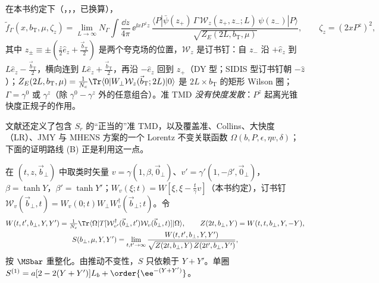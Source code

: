 \begin{definition}[准 TMD]\label{def:lamet-quasi-tmd}
在本书约定下（\cite{Ji:2019ewn}，\cite[第~3~节]{Liu:2022nnk}，\cite{Ebert:2022fmh}，已换算），
\begin{equation}\label{eq:lamet-quasi-tmd}
\tilde f_\Gamma(x,b_{\mathrm T},\mu,\zeta_z)=\lim_{L\to\infty}N_\Gamma\int\frac{\dd z}{4\pi}\,\ee^{\ii xP^zz}\,\frac{\langle P|\bar\psi(z_+)\,\Gamma\,\mathcal W_z(z_+,z_-;L)\,\psi(z_-)|P\rangle}{\sqrt{Z_E(2L,b_{\mathrm T},\mu)}},\qquad\zeta_z=(2xP^z)^2,
\end{equation}
其中 $z_\pm\equiv\pm(\frac z2\hat e_z+\frac{\vec b_{\mathrm T}}2)$ 是两个夸克场的位置，$\mathcal W_z$ 是订书钉：自 $z_-$ 沿 $+\hat e_z$ 到 $L\hat e_z-\frac{\vec b_{\mathrm T}}2$，横向连到 $L\hat e_z+\frac{\vec b_{\mathrm T}}2$，再沿 $-\hat e_z$ 回到 $z_+$（DY 型；SIDIS 型订书钉朝 $-\hat z$）；$Z_E(2L,b_{\mathrm T},\mu)=\frac1{N_c}\Tr\langle0|W_\perp\mathcal W_z(\vec b_{\mathrm T};2L)|0\rangle$ 是 $2L\times b_{\mathrm T}$ 的矩形 Wilson 圈；$\Gamma=\gamma^0$ 或 $\gamma^z$（除 $\gamma^0-\gamma^z$ 外的任意组合）。准 TMD \emph{没有快度发散}：$P^z$ 起离光锥快度正规子的作用。
\end{definition}

文献\cite{Ebert:2022fmh}还定义了包含 $S_r$ 的“正当的”准 TMD，以及覆盖准、Collins、大快度（LR）、JMY 与 MHENS 方案的一个 Lorentz 不变关联函数 $\Omega(b,P,\epsilon,\eta v,\delta)$；下面的证明路线 (B) 正是利用这一点。

\begin{definition}\label{def:lamet-soft-offlc}
在 $(t,z,\vec b_\perp)$ 中取类时矢量 $v=\gamma(1,\beta,\vec0_\perp)$、$v'=\gamma'(1,-\beta',\vec0_\perp)$，$\beta=\tanh Y$，$\beta'=\tanh Y'$；$W_v(\xi;t)=W[\xi,\xi-\frac t\gamma v]$（本书约定），订书钉 $\mathcal W_v(\vec b_\perp,t)=W_v(0;t)W_\perp W_v^\dagger(\vec b_\perp;t)$。令
\begin{equation}\label{eq:lamet-soft-offlc}
\begin{gathered}
W(t,t',b_\perp,Y,Y')=\tfrac1{N_c}\Tr\langle\Omega|T[\mathcal W^\dagger_{v'}(\vec b_\perp,t')\mathcal W_v(\vec b_\perp,t)]|\Omega\rangle,\qquad Z(2t,b_\perp,Y)=W(t,t,b_\perp,Y,-Y),\\
S(b_\perp,\mu,Y,Y')=\lim_{t,t'\to\infty}\frac{W(t,t',b_\perp,Y,Y')}{\sqrt{Z(2t,b_\perp,Y)\,Z(2t',b_\perp,Y')}},
\end{gathered}
\end{equation}
按 $\MSbar$ 重整化。由推动不变性，$S$ 只依赖于 $Y+Y'$。单圈 $S^{(1)}=a[2-2(Y+Y')]L_b+\order{\ee^{-(Y+Y')}}$。%
\end{definition}

